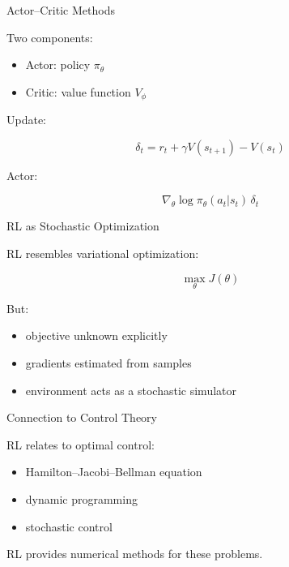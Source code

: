 \documentclass{beamer}
\begin{document}
\begin{frame}{Actor--Critic Methods}

  Two components:

  \begin{itemize}
  \item Actor: policy $\pi_\theta$
  \item Critic: value function $V_\phi$
  \end{itemize}

  Update:

  \[
  \delta_t = r_t + \gamma V(s_{t+1}) - V(s_t)
  \]

  Actor:

  \[
  \nabla_\theta \log \pi_\theta(a_t|s_t)\,\delta_t
  \]

\end{frame}

\begin{frame}{RL as Stochastic Optimization}

  RL resembles variational optimization:

  \[
  \max_\theta J(\theta)
  \]

  But:

  \begin{itemize}
  \item objective unknown explicitly
  \item gradients estimated from samples
  \item environment acts as a stochastic simulator
  \end{itemize}

\end{frame}

\begin{frame}{Connection to Control Theory}

  RL relates to optimal control:

  \begin{itemize}
  \item Hamilton--Jacobi--Bellman equation
  \item dynamic programming
  \item stochastic control
  \end{itemize}

  RL provides numerical methods for these problems.

\end{frame}
\end{document}
